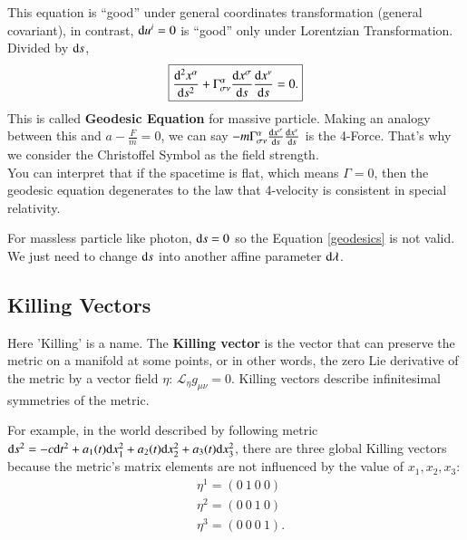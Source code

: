 \documentclass[openany,10pt]{book}
\theoremstyle{definition}
\theoremstyle{definition}
\theoremstyle{remark}
\begin{document}
This equation is ``good'' under general coordinates transformation  (general covariant), in contrast, ${\rm d}u^i=0$ is ``good'' only under Lorentzian Transformation.  \\
Divided by ${\rm d}s$, 
\begin{equation}\label{geodesics}
\boxed{
    \frac{{\rm d}^2 x^\alpha}{{\rm d}s^2}+\Gamma^\alpha_{\sigma\nu}\frac{{\rm d} x^\sigma}{{\rm d}s}\frac{{\rm d} x^\nu}{{\rm d}s}=0.}
\end{equation}
This is called \textbf{Geodesic Equation} for massive particle. Making an analogy between this and $a-\frac{F}{m}=0$, we can say $-m \Gamma^\alpha_{\sigma\nu}\frac{{\rm d} x^\sigma}{{\rm d}s}\frac{{\rm d} x^\nu}{{\rm d}s}$ is the 4-Force. That's why we consider the Christoffel Symbol as the field strength.\\
You can interpret that if the spacetime is flat, which means $\Gamma=0$, then the geodesic equation degenerates to the law that  4-velocity is consistent in special relativity.

For massless particle like photon, ${\rm d}s=0$ so the Equation \ref{geodesics} is not valid. We just need to change ${\rm d}s$ into another affine parameter ${\rm d}\lambda$.


\subsection{Killing Vectors}\label{killing}
Here 'Killing' is a name. The {\bfseries Killing vector} is the vector that can preserve the metric on a manifold at some points, or in other words, the zero Lie derivative of the metric by a vector field $\eta$: $\mathcal{L}_\eta g_{\mu\nu}=0$. Killing vectors describe infinitesimal symmetries of the metric.

For example, in the world described by following metric ${\rm{d}}s^2= -c{\rm{d}}t^2+a_1(t){\rm{d}}x_1^2+a_2(t){\rm{d}}x_2^2+a_3(t){\rm{d}}x_3^2$, there are three global Killing vectors because the metric's matrix elements are not influenced by the value of $x_1, x_2, x_3$:
\begin{equation}
    \begin{aligned}
    &\eta^1=(0\ 1\ 0\ 0)\\
    &\eta^2=(0\ 0\ 1\ 0)\\
    &\eta^3=(0\ 0\ 0\ 1).
    \end{aligned}
\end{equation}
\end{document}
